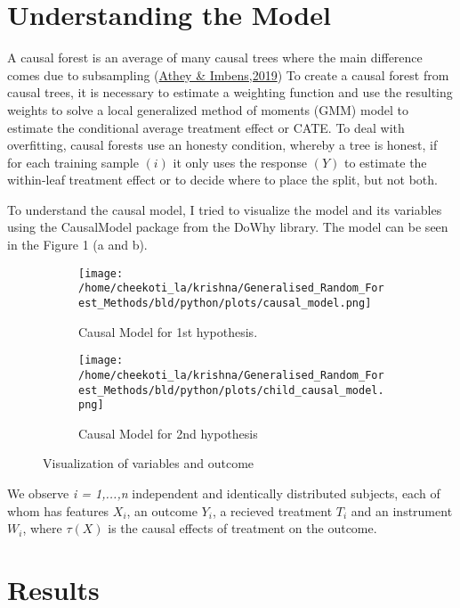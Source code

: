 \documentclass[11pt, a4paper, leqno]{article}
\begin{document}
 \section{Understanding the Model} %
\label{sec:Understanding the Model}

A causal forest is an average of many causal trees where the main difference comes due to subsampling
(\href{https://www.annualreviews.org/doi/abs/10.1146/annurev-economics-080217-053433}{Athey \& Imbens,2019})
To create a causal forest from
causal trees, it is necessary to estimate a weighting function and use the resulting weights to solve a local generalized method of moments (GMM)
model to estimate the conditional average treatment effect or CATE. To deal with overfitting, causal forests use an honesty condition, whereby a
tree is honest, if for each training sample $(i)$ it only uses the response $(Y)$ to estimate the within-leaf treatment effect or to decide where
to place the split, but not both.

To understand the causal model, I tried to visualize the model and its variables using the CausalModel package from the DoWhy library.
The model
can be seen in the Figure 1 (a and b).

\begin{figure}[!tbp]
  \begin{subfigure}[b]{0.5\textwidth}
    \texttt{[image: /home/cheekoti\_la/krishna/Generalised\_Random\_Forest\_Methods/bld/python/plots/causal\_model.png]}
    \caption{Causal Model for 1st hypothesis.}
    \label{fig:f1}
  \end{subfigure}
  \hfill
  \begin{subfigure}[b]{0.5\textwidth}
    \texttt{[image: /home/cheekoti\_la/krishna/Generalised\_Random\_Forest\_Methods/bld/python/plots/child\_causal\_model.png]}
    \caption{Causal Model for 2nd hypothesis}
    \label{fig:f2}
  \end{subfigure}
  \caption{Visualization of variables and outcome}
\end{figure}

We observe \textit{i = 1,...,n} independent and identically distributed subjects, each of whom has features $X_i$, an outcome $Y_i$, a recieved
treatment $T_i$ and an instrument $W_i$, where $\tau(X)$ is the causal effects of treatment on the outcome.


 \section{Results} %
\label{sec:Results}
\end{document}
